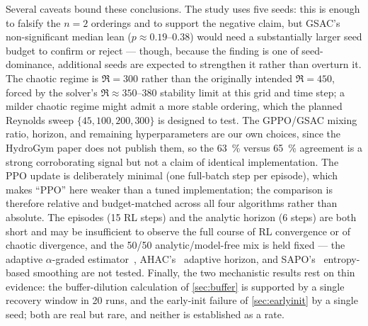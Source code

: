 Several caveats bound these conclusions. The study uses five seeds: this is
enough to falsify the $n=2$ orderings and to support the negative claim, but
GSAC's non-significant median lean ($p\approx0.19$--$0.38$) would need a
substantially larger seed budget to confirm or reject --- though, because the
finding is one of seed-dominance, additional seeds are expected to strengthen
it rather than overturn it. The chaotic regime is $\Re=300$ rather than the
originally intended $\Re=450$, forced by the solver's $\Re\approx350$--$380$
stability limit at this grid and time step; a milder chaotic regime might
admit a more stable ordering, which the planned Reynolds sweep
$\{45,100,200,300\}$ is designed to test. The GPPO/GSAC mixing ratio,
horizon, and remaining hyperparameters are our own choices, since the
HydroGym paper does not publish them, so the \SI{63}{\percent} versus
\SI{65}{\percent} agreement is a strong corroborating signal but not a claim
of identical implementation. The PPO update is deliberately minimal (one
full-batch step per episode), which makes ``PPO'' here weaker than a tuned
implementation; the comparison is therefore relative and budget-matched
across all four algorithms rather than absolute. The episodes (15 RL steps)
and the analytic horizon (6 steps) are both short and may be insufficient to
observe the full course of RL convergence or of chaotic divergence, and the
50/50 analytic/model-free mix is held fixed --- the adaptive $\alpha$-graded
estimator~\cite{suh2022}, AHAC's~\cite{ahac2024} adaptive horizon, and
SAPO's~\cite{sapo2025} entropy-based smoothing are not tested. Finally, the
two mechanistic results rest on thin evidence: the buffer-dilution
calculation of \cref{sec:buffer} is supported by a single recovery window in
20 runs, and the early-init failure of \cref{sec:earlyinit} by a single
seed; both are real but rare, and neither is established as a rate.
